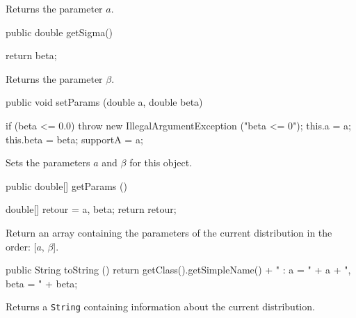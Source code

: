   \begin{tabb} Returns the parameter $a$.
  \end{tabb}
\begin{htmlonly}
\end{htmlonly}
\begin{code}

   public double getSigma()\begin{hide} {
      return beta;
   }\end{hide}
\end{code}
  \begin{tabb} Returns the parameter $\beta$.
  \end{tabb}
\begin{htmlonly}
\end{htmlonly}
\begin{code}

   public void setParams (double a, double beta)\begin{hide} {
      if (beta <= 0.0)
        throw new IllegalArgumentException ("beta <= 0");
      this.a  = a;
      this.beta  = beta;
      supportA = a;
   }\end{hide}
\end{code}
  \begin{tabb} Sets the parameters $a$ and $\beta$ for this object.
  \end{tabb}
\begin{htmlonly}
\end{htmlonly}
\begin{code}

   public double[] getParams ()\begin{hide} {
      double[] retour = {a, beta};
      return retour;
   }\end{hide}
\end{code}
\begin{tabb}
   Return an array containing the parameters of the current distribution
   in the order: [$a$, $\beta$].
\end{tabb}
\begin{htmlonly}
   \return{[$a$, $\beta$]}
\end{htmlonly}
\begin{hide}\begin{code}

   public String toString () {
      return getClass().getSimpleName() + " : a = " + a + ", beta = " + beta;
   }
\end{code}
\begin{tabb}
   Returns a \texttt{String} containing information about the current distribution.
\end{tabb}
\begin{htmlonly}
\end{htmlonly}\end{hide}
\begin{code}\begin{hide}
}\end{hide}
\end{code}
